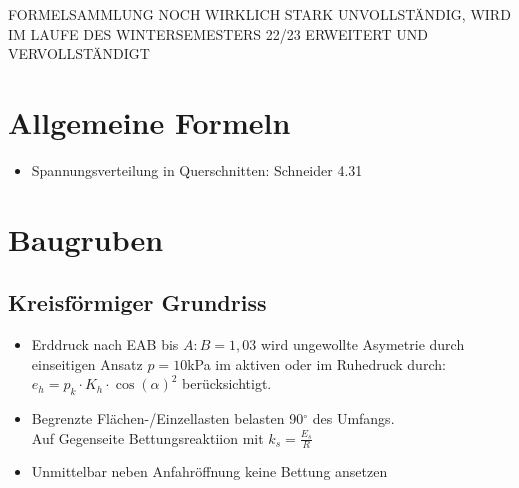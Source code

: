 \documentclass[fleqn,twoside]{article}
\title{\Huge{\textfrak{Angewandte Geotechnik \\Formelsammlung}}}
\author{\calligra{Jonathan C. Walter}\\\calligra{Jonas H. Konrad}}
\date{\textfrak{\today}}
\begin{document}
\parindent 0pt
\fancyfoot[R]{\frakfamily }
\maketitle \thispagestyle{empty}
\begin{center}
FORMELSAMMLUNG NOCH WIRKLICH STARK UNVOLLSTÄNDIG, WIRD IM LAUFE DES WINTERSEMESTERS 22/23 ERWEITERT UND VERVOLLSTÄNDIGT\\
\end{center}
\tableofcontents



\newpage

\section{Allgemeine Formeln}
\begin{itemize}
    \item Spannungsverteilung in Querschnitten: Schneider 4.31
\end{itemize}

\section{Baugruben}

\subsection{Kreisförmiger Grundriss}
\begin{itemize}
    \item Erddruck nach EAB bis $A:B=1,03$ wird ungewollte Asymetrie durch einseitigen Ansatz $p=10$kPa im aktiven oder im Ruhedruck durch: $e_h = p_k \cdot K_h \cdot \cos(\alpha)^2$ berücksichtigt.
    \item Begrenzte Flächen-/Einzellasten belasten 90$^\circ$ des Umfangs.\\ 
    Auf Gegenseite Bettungsreaktiion mit $k_s = \frac{E_s}{R}$
    \item Unmittelbar neben Anfahröffnung keine Bettung ansetzen
\end{itemize}
\end{document}
